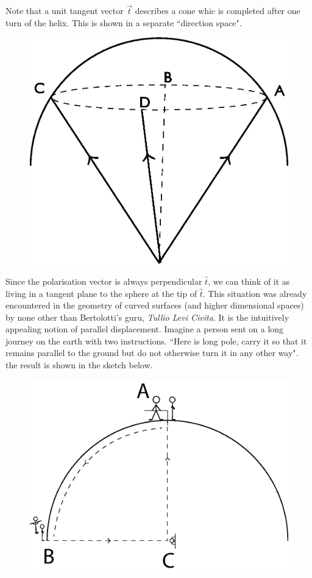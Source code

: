 Note that a unit tangent vector $\overrightarrow{t}$ describes a cone whic is completed after
one turn of the helix. This is shown in a separate ``direction space".
\begin{figure}[H]
\centering
\includegraphics[scale=0.19]{src/images/chap26/21.jpg}
\end{figure}

Since the polarisation vector is always perpendicular $\hat{t}$, we can think of it as
living in a tangent plane to the sphere at the tip of $\hat{t}$. This situation was already
encountered in the geometry of curved surfaces (and higher dimensional spaces)
by none other than Bertolotti's guru, \textit{Tullio Levi Civita}. It is the intuitively
appealing notion of parallel displacement. Imagine a person sent on a long
journey on the earth with two instructions. ``Here is long pole, carry it so that
it remains parallel to the ground but do not otherwise turn it in any other way".
the result is shown in the sketch below.
\begin{figure}[H]
\centering
\includegraphics[scale=0.23]{src/images/chap26/22.jpg}
\end{figure}

